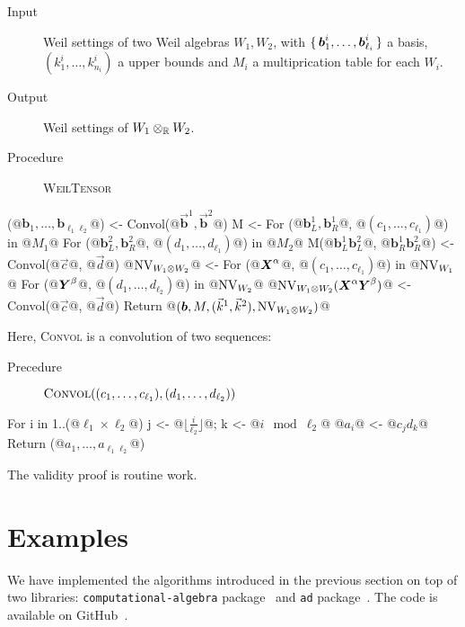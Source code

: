 \documentclass[%
  sigconf,authorversion,screen]{acmart}
\begin{document}
\begin{algorithm}[WeilTensor]\label{alg:weil-tensor}
\hfill\vspace{-.25em}
\begin{description}
  \item[Input] Weil settings of two Weil algebras $W_1, W_2$,
  with $\set{\boldsymbol{b}_1^i, \dots, \boldsymbol{b}_{\ell_i}^i}$ a basis,
  $(k^i_1, \dots, k^i_{n_i})$ a upper bounds and $M_i$ a multiprication table for each $W_i$.
  \item[Output] Weil settings of $W_1 \otimes_{\mathbb{R}} W_2$.
  \item[Procedure] {\upshape \textsc{WeilTensor}}
\end{description}
\begin{alg}
(@$\boldsymbol{b}_1, \dots, \boldsymbol{b}_{\ell_1 \ell_2}$@) <- Convol(@$\vec{\boldsymbol{b}}^1, \vec{\boldsymbol{b}}^2$@)
M <- {}
For ({@$\boldsymbol{b}^1_L, \boldsymbol{b}^1_R$@}, @$(c_1,\dots,c_{\ell_1})$@) in @$M_1$@
  For ({@$\boldsymbol{b}^2_L, \boldsymbol{b}^2_R$@}, @$(d_1,\dots,d_{\ell_1})$@) in @$M_2$@
    M({@$\boldsymbol{b}^1_L \boldsymbol{b}^2_L$@, @$\boldsymbol{b}^1_R \boldsymbol{b}^2_R$@}) <- Convol(@$\vec{c}$@, @$\vec{d}$@)
@$\operatorname{NV}_{W_1 \otimes W_2}$@ <- {}
For (@$\boldsymbol{X}^\alpha$@, @$(c_1, \dots, c_{\ell_1})$@) in @$\operatorname{NV}_{W_1}$@
  For (@$\boldsymbol{Y}^\beta$@, @$(d_1,\dots,d_{\ell_2})$@) in @$\operatorname{NV}_{W_2}$@
    @$\operatorname{NV}_{W_1 \otimes W_2}(\boldsymbol{X}^\alpha\boldsymbol{Y}^\beta)$@ <- Convol(@$\vec{c}$@, @$\vec{d}$@)
Return @$(\boldsymbol{b}, M, (\vec{k}^1, \vec{k}^2), \operatorname{NV}_{W_1 \otimes W_2})$@
\end{alg}

Here, {\upshape \textsc{Convol}} is a convolution of two sequences:
\begin{description}
  \item[Precedure] $\mathop{\text{\upshape\scshape Convol}}((c_1, \dots, c_{\ell_1}), (d_1, \dots, d_{\ell_2}))$
\end{description}
\begin{alg}
For i in 1..(@$\ell_1 \times \ell_2$@)
  j <- @$\lfloor \frac{i}{\ell_2} \rfloor$@; k <- @$i \mod{\ell_2}$@
  @$a_i$@ <- @$c_j d_k$@
Return (@$a_1, \dots, a_{\ell_1 \ell_2}$@)
\end{alg}
\end{algorithm}

The validity proof is routine work.

\section{Examples}\label{sec:examples}
We have implemented the algorithms introduced in the previous section on top of two libraries: \texttt{computational-algebra} package~\cite{ISHII:2018ek,computational-algebra} and \texttt{ad} package~\cite{Kmett:2010aa}.
The code is available on GitHub~\cite{Ishii:2020aa}.
\end{document}
